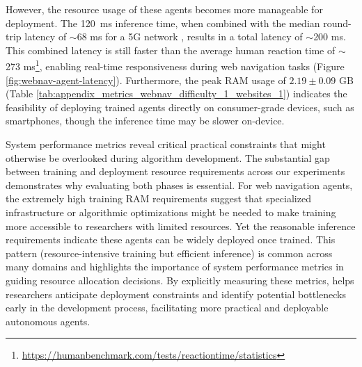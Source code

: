 However, the resource usage of these agents becomes more manageable for deployment.
The 120~ms inference time, when combined with the median round-trip latency of $\sim$68 ms for a 5G network \citep{schafhalter2023leveraging}, results in a total latency of $\sim$200 ms. This combined latency is still faster than the average human reaction time of $\sim$273 ms\footnote{\url{https://humanbenchmark.com/tests/reactiontime/statistics}}, enabling real-time responsiveness during web navigation tasks (Figure \ref{fig:webnav-agent-latency}).
Furthermore, the peak RAM usage of $2.19 \pm 0.09$ GB (Table \ref{tab:appendix_metrics_webnav_difficulty_1_websites_1}) indicates the feasibility of deploying trained agents directly on consumer-grade devices, such as smartphones, though the inference time may be slower on-device.

System performance metrics reveal critical practical constraints that might otherwise be overlooked during algorithm development.
The substantial gap between training and deployment resource requirements across our experiments demonstrates why evaluating both phases is essential. For web navigation agents, the extremely high training RAM requirements suggest that specialized infrastructure or algorithmic optimizations might be needed to make training more accessible to researchers with limited resources. Yet the reasonable inference requirements indicate these agents can be widely deployed once trained. This pattern (resource-intensive training but efficient inference) is common across many domains and highlights the importance of system performance metrics in guiding resource allocation decisions.
By explicitly measuring these metrics, \method helps researchers anticipate deployment constraints and identify potential bottlenecks early in the development process, facilitating more practical and deployable autonomous agents.


